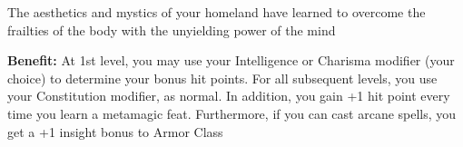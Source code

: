 
The aesthetics and mystics of your homeland have learned to overcome the frailties of the body with the unyielding power of the mind

\textbf{Benefit:} At 1st level, you may use your Intelligence or Charisma modifier (your choice) to determine your bonus hit points. For all subsequent levels, you use your Constitution modifier, as normal. In addition, you gain +1 hit point every time you learn a metamagic feat. Furthermore, if you can cast arcane spells, you get a +1 insight bonus to Armor Class